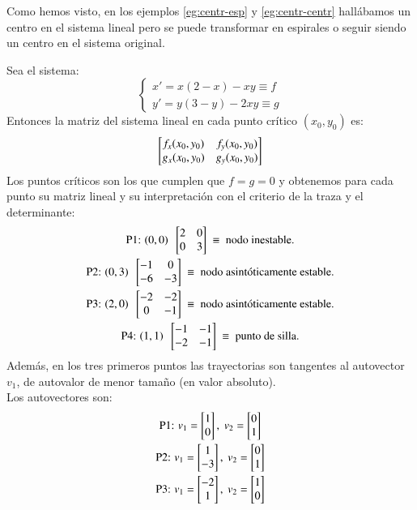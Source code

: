 \begin{obs}
    Como hemos visto, en los ejemplos \ref{eg:centr-esp} y \ref{eg:centr-centr} hallábamos un centro en el sistema lineal pero se puede transformar en espirales o seguir siendo un centro en el sistema original.
\end{obs}
\pagebreak %
\begin{eg}
    Sea el sistema:
    $$
        \begin{cases}
            x' = x(2-x) - xy \equiv f\\
            y' = y(3-y) -2xy \equiv g
        \end{cases}
    $$
    Entonces la matriz del sistema lineal en cada punto crítico $(x_0, y_0)$ es:
    $$
        \mx{f_x(x_0, y_0) & f_y(x_0, y_0)\\ g_x(x_0, y_0) & g_y(x_0, y_0)}
    $$
    Los puntos críticos son los que cumplen que $f = g = 0$ y obtenemos para cada punto su matriz lineal y su interpretación con el criterio de la traza y el determinante:
    \begin{gather*}
        \text{P1: }(0, 0)\ \ \mx{2 & 0 \\ 0 & 3}\ \equiv \text{ nodo inestable.}\\
        \text{P2: }(0, 3)\ \ \mx{-1 & 0 \\ -6 & -3}\ \equiv \text{ nodo asintóticamente estable.}\\
        \text{P3: }(2, 0)\ \ \mx{-2 & -2 \\ 0 & -1}\ \equiv \text{ nodo asintóticamente estable.}\\
        \text{P4: }(1, 1)\ \ \mx{-1 & -1 \\ -2 & -1}\ \equiv \text{ punto de silla.}\\
    \end{gather*}
    Además, en los tres primeros puntos las trayectorias son tangentes al autovector $v_1$, de autovalor de menor tamaño (en valor absoluto).\\
    Los autovectores son:
    \begin{gather*}
        \text{P1: } v_1 = \mx{1\\ 0},\ v_2 = \mx{0\\1}\\
        \text{P2: } v_1 = \mx{1\\ -3},\ v_2 = \mx{0\\1}\\
        \text{P3: } v_1 = \mx{-2\\ 1},\ v_2 = \mx{1\\0}\\

\end{gather*}
\end{eg}
